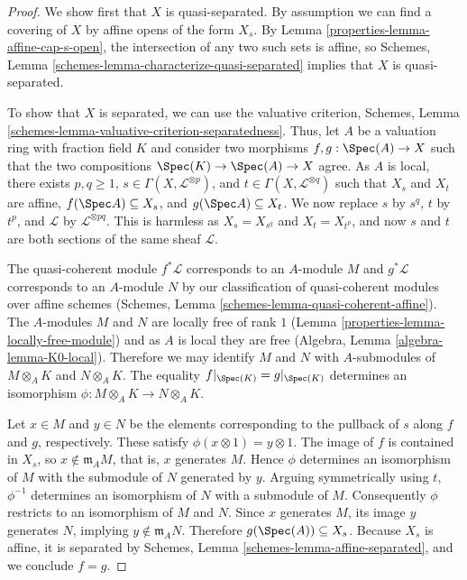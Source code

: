 \begin{proof}

We show first that $X$ is quasi-separated.  By assumption we
can find a covering of $X$ by affine opens of the form
$X_s$.  By Lemma \ref{properties-lemma-affine-cap-s-open}, the
intersection of any two such sets is affine, so Schemes, Lemma
\ref{schemes-lemma-characterize-quasi-separated} implies
that $X$ is quasi-separated.

\medskip\noindent
To show that $X$ is separated, we can use the valuative
criterion, Schemes, Lemma
\ref{schemes-lemma-valuative-criterion-separatedness}.
Thus, let $A$ be a valuation ring with fraction field $K$
and consider two morphisms $f, g : \Spec(A) \to X$ such that
the two compositions $\Spec(K) \to \Spec(A) \to X$ agree.
As $A$ is local, there exists $p, q \ge 1$, $s \in \Gamma(X,
\mathcal{L}^{\otimes p})$, and $t \in \Gamma(X,
\mathcal{L}^{\otimes q})$ such that $X_s$ and $X_t$ are
affine, $f(\Spec A) \subseteq X_s$, and $g(\Spec A)
\subseteq X_t$.  We now replace $s$ by $s^q$, $t$ by $t^p$,
and $\mathcal{L}$ by $\mathcal{L}^{\otimes pq}$.  This is
harmless as $X_s = X_{s^q}$ and $X_t = X_{t^p}$, and now $s$
and $t$ are both sections of the same sheaf $\mathcal{L}$.

\medskip\noindent
The quasi-coherent module $f^*\mathcal{L}$ corresponds to an $A$-module $M$ and
$g^*\mathcal{L}$ corresponds to an $A$-module $N$ by our
classification of quasi-coherent modules over affine schemes
(Schemes, Lemma \ref{schemes-lemma-quasi-coherent-affine}).
The $A$-modules $M$ and $N$ are locally free of rank
$1$ (Lemma \ref{properties-lemma-locally-free-module}) and as $A$ is
local they are free (Algebra, Lemma
\ref{algebra-lemma-K0-local}).  Therefore we may identify
$M$ and $N$ with $A$-submodules of $M \otimes_A K$ and $N
\otimes_A K$.  The equality $f|_{\Spec(K)} = g|_{\Spec(K)}$
determines an isomorphism $\phi \colon M \otimes_A K \to N
\otimes_A K$.

\medskip\noindent
Let $x \in M$ and $y \in N$ be the elements corresponding to
the pullback of $s$ along $f$ and $g$, respectively.  These
satisfy $\phi(x \otimes 1) = y \otimes 1$.  The image of $f$
is contained in $X_s$, so $x \not\in \mathfrak{m}_A M$, that
is, $x$ generates $M$.  Hence $\phi$ determines an
isomorphism of $M$ with the submodule of $N$ generated by
$y$.  Arguing symmetrically using $t$, $\phi^{-1}$
determines an isomorphism of $N$ with a submodule of $M$.
Consequently $\phi$ restricts to an isomorphism of $M$ and
$N$.  Since $x$ generates $M$, its image $y$ generates
$N$, implying $y \not\in \mathfrak{m}_A N$.  Therefore
$g(\Spec(A)) \subseteq X_s$.  Because $X_s$ is affine, it is
separated by Schemes, Lemma \ref{schemes-lemma-affine-separated},
and we conclude $f = g$.
\end{proof}

